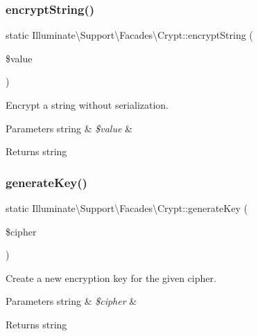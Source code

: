 \subsubsection{\texorpdfstring{encrypt\+String()}{encryptString()}}
{\footnotesize\ttfamily static Illuminate\textbackslash{}\+Support\textbackslash{}\+Facades\textbackslash{}\+Crypt\+::encrypt\+String (\begin{DoxyParamCaption}\item[{}]{\$value }\end{DoxyParamCaption})\hspace{0.3cm}{\ttfamily [static]}}

Encrypt a string without serialization.


\begin{DoxyParams}[1]{Parameters}
string & {\em \$value} & \\
\hline
\end{DoxyParams}
\begin{DoxyReturn}{Returns}
string 
\end{DoxyReturn}
\mbox{\label{class_illuminate_1_1_support_1_1_facades_1_1_crypt_a3e38bd91ea1c66bd8e37032c98a1ed9f}} 
\subsubsection{\texorpdfstring{generate\+Key()}{generateKey()}}
{\footnotesize\ttfamily static Illuminate\textbackslash{}\+Support\textbackslash{}\+Facades\textbackslash{}\+Crypt\+::generate\+Key (\begin{DoxyParamCaption}\item[{}]{\$cipher }\end{DoxyParamCaption})\hspace{0.3cm}{\ttfamily [static]}}

Create a new encryption key for the given cipher.


\begin{DoxyParams}[1]{Parameters}
string & {\em \$cipher} & \\
\hline
\end{DoxyParams}
\begin{DoxyReturn}{Returns}
string 
\end{DoxyReturn}
\mbox{\label{class_illuminate_1_1_support_1_1_facades_1_1_crypt_a9067fab9dcf1d9ed7d81439dcaa16a47}} 
